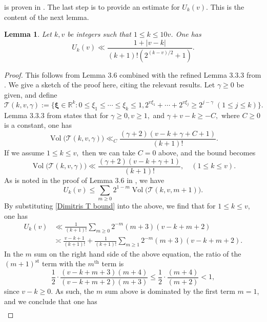\documentclass{amsart}
\newtheorem{lemma}[theorem]{Lemma}
\theoremstyle{definition}
\numberwithin{equation}{section}
\newcommand{\R}{\mathbb{R}}
\DeclareMathOperator{\Vol}{Vol}
\begin{document}
		 is proven in . The last step is to provide an estimate for $U_k(v)$. This is the content of the next lemma.
		\begin{lemma}\label{lem UB 5} Let $k,v$ be integers such that  $1 \leq k \leq 10v$. One has
			$$U_k(v) \ll \frac{1 + |v-k|}{(k+1)! (2^{(k-v)/2}+1)}.$$
		\end{lemma}
		\begin{proof}
			This follows from Lemma 3.6 \cite{ford2006integers} combined with the refined Lemma 3.3.3 from \cite{koukoulopoulos2010generalized}. We give a sketch of the proof here, citing the relevant results. Let $\gamma \geq 0$ be given, and define
			$$\mathcal{T}(k,v,\gamma) := \{\bm{\xi} \in \R^k : 0 \leq \xi_1 \leq \cdots \leq \xi_k \leq 1, 2^{v\xi_1}+\cdots + 2^{v\xi_j} \geq 2^{j-\gamma} \; (1 \leq j \leq k)\}.$$
			\noindent Lemma 3.3.3 from \cite{koukoulopoulos2010generalized} states that for $\gamma \geq 0, v \geq 1,$ and $\gamma + v - k \geq -C,$ where $C \geq 0$ is a constant, one has
			\begin{equation*}
				\Vol\big(\mathcal{T}(k,v,\gamma)\big) \ll_C \frac{(\gamma + 2)(v-k+\gamma + C + 1)}{(k+1)!}.
			\end{equation*}
			If we assume $1 \le k \leq v,$ then we can take $C=0$ above, and the bound becomes
			\begin{equation}\label{Dimitris T bound}
				\Vol\big(\mathcal{T}(k,v,\gamma)\big) \ll \frac{(\gamma + 2)(v-k+\gamma + 1)}{(k+1)!}, \quad (1 \leq k \leq v).
			\end{equation}
			As is noted in the proof of Lemma 3.6 in \cite{ford2006integers}, we have
			$$U_k(v) \leq \sum_{m \geq 0 }2^{1-m}\Vol\big(\mathcal{T}(k,v,m+1)\big).$$
			By substituting \eqref{Dimitris T bound} into the above, we find that for $1 \leq k \leq v$, one has
			\begin{align*}
				U_k(v) &\ll \frac{1}{(k+1)!}\sum_{m \geq 0 }2^{-m}(m+ 3)(v-k+m+2)\\& \asymp \frac{v-k+1}{(k+1)!}+ \frac{1}{(k+1)!}\sum_{m \geq 1}2^{-m}(m+ 3)(v-k+m+2).
			\end{align*}
			In the $m$ sum on the right hand side of the above equation, the ratio of the $(m+1)^{\text{st}}$ term with the $m^{\text{th}}$  term is 
			$$\frac{1}{2} \cdot \frac{(v-k+m+3)(m+4)}{(v-k+m+2)(m+3)} \leq \frac{1}{2} \cdot \frac{(m+4)}{(m+2)} < 1,$$
			since $v-k \geq 0$. As such, the $m$ sum above is dominated by the first term $m=1$, and we conclude that one has
			\begin{align}\label{U bound Dimitris}

\end{align}
\end{proof}
\end{document}

